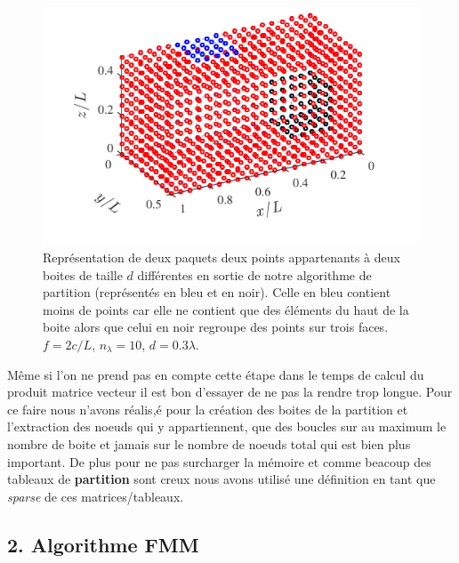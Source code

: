 \documentclass[10pt]{article}
\begin{document}
\begin{multicols}{2}
\vspace*{22pt}

\begin{figure}[H]
  \begin{center}
  \includegraphics[width=0.95\columnwidth]{Q6.pdf}
  \vspace*{-11pt}
  \caption{Représentation de deux paquets deux points appartenants à deux boites de taille $d$ différentes en sortie de notre algorithme de partition (représentés en bleu et en noir). Celle en bleu contient moins de points car elle ne contient que des éléments du haut de la boite alors que celui en noir regroupe des points sur trois faces. $f=2c/L$, $n_\lambda = 10$, $d=0.3\lambda$.}
  \label{fig:Q6}
  \end{center}
\end{figure}

Même si l'on ne prend pas en compte cette étape dans le temps de calcul du produit matrice vecteur il est bon d'essayer de ne pas la rendre trop longue. Pour ce faire nous n'avons réalis,é pour la création des boites de la partition et l'extraction des noeuds qui y appartiennent, que des boucles sur au maximum le nombre de boite et jamais sur le nombre de noeuds total qui est bien plus important. De plus pour ne pas surcharger la mémoire et comme beacoup des tableaux de \textbf{partition} sont creux nous avons utilisé une définition en tant que \textit{sparse} de ces matrices/tableaux. \\





\subsection*{2. Algorithme FMM}


\end{multicols}
\end{document}
